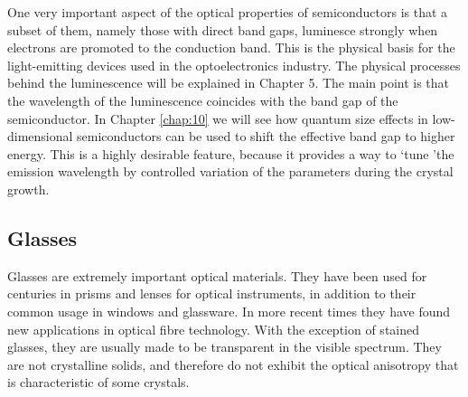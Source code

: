 \documentclass[12pt]{book}
\begin{document}
One very important aspect of the optical properties of semiconductors is that a subset of them, namely those with direct band gaps, luminesce strongly when electrons are promoted to the conduction band. This is the physical basis for the light-emitting devices used in the optoelectronics industry. The physical processes behind the luminescence will be explained in Chapter 5. The main point is that the wavelength of the luminescence coincides with the band gap of the semiconductor. In Chapter \ref{chap:10} we will see how quantum size effects in low-dimensional semiconductors can be used to shift the effective band gap to higher energy. This is a highly desirable feature, because it provides a way to \lq tune \rq the emission wavelength by controlled variation of the parameters during the crystal growth.

\subsection{Glasses}

Glasses are extremely important optical materials. They have been used for centuries in prisms and lenses for optical instruments, in addition to their common usage in windows and glassware. In more recent times they have found new applications in optical fibre technology. With the exception of stained glasses, they are usually made to be transparent in the visible spectrum. They are not crystalline solids, and therefore do not exhibit the optical anisotropy that is characteristic of some crystals.
\end{document}
